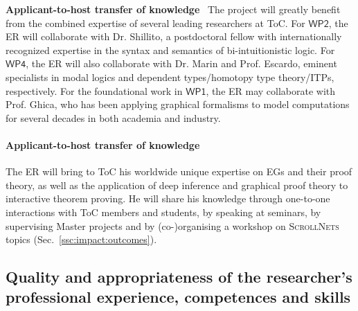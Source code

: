\documentclass[11pt]{msca-pf}
\newcommand{\proj}{\small\textsc{ScrollNets}}
\newcommand{\WP}[1]{$\mathsf{WP#1}$}
\begin{document}
\textbf{Applicant-to-host transfer of knowledge}~ The project will greatly benefit from the combined
expertise of several leading researchers at ToC. For \WP{2}, the ER will collaborate with Dr.
Shillito, a postdoctoral fellow with internationally recognized expertise in the syntax and
semantics of bi-intuitionistic logic. For \WP{4}, the ER will also collaborate with Dr. Marin and
Prof. Escardo, eminent specialists in modal logics and dependent types/homotopy type theory/ITPs,
respectively. For the foundational work in \WP{1}, the ER may collaborate with Prof. Ghica, who has
been applying graphical formalisms to model computations for several decades in both academia and
industry.

\paragraph{Applicant-to-host transfer of knowledge}
The ER will bring to ToC his worldwide unique expertise on EGs and their proof theory, as well as
the application of deep inference and graphical proof theory to interactive theorem proving. He will
share his knowledge through one-to-one interactions with ToC members and students, by speaking at
seminars, by supervising Master projects and by (co-)organising a workshop on {\proj} topics
(Sec.~\ref{ssc:impact:outcomes}).

\subsection{Quality and appropriateness of the researcher's professional
    experience, competences and skills}
\label{ssc:excellence:researcher}
\end{document}
